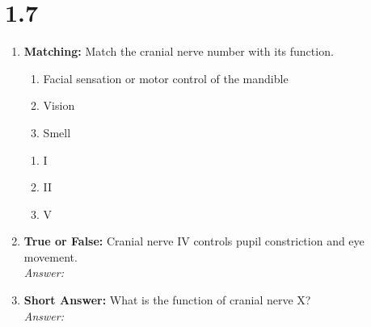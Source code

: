 \section*{1.7 \squigglyline}
\begin{enumerate}[label=\textbf{Q1.7.\arabic*}]

      \item \textbf{Matching:} Match the cranial nerve number with its function.
            \begin{wordbox}
                  \begin{enumerate}[label=(\roman*)]
                        \item Facial sensation or motor control of the mandible
                        \item Vision
                        \item Smell
                  \end{enumerate}
            \end{wordbox}
            \begin{enumerate}[label=(\alph*)]
                  \item I \quad \dotfill \quad \underline{\hspace{3cm}}\\[0.5em]
                  \item II \quad \dotfill \quad \underline{\hspace{3cm}}\\[0.5em]
                  \item V \quad \dotfill \quad \underline{\hspace{3cm}}
            \end{enumerate}

      \item \textbf{True or False:} Cranial nerve IV controls pupil constriction and eye movement. \\
            \textit{Answer:} %

      \item \textbf{Short Answer:} What is the function of cranial nerve X? \\
            \textit{Answer:} \\ %


\end{enumerate}

